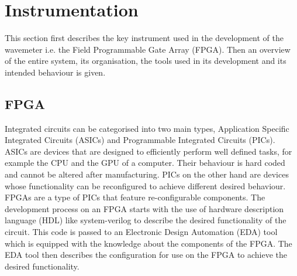 \documentclass[12pt, twoside]{report}
\begin{document}
\chapter{Instrumentation}
This section first describes the key instrument used in the development of the wavemeter i.e. the Field Programmable Gate Array (FPGA). Then an overview of the entire system, its organisation, the tools used in its development and its intended behaviour is given. 

\section{FPGA}
Integrated circuits can be categorised into two main types, Application Specific Integrated Circuits (ASICs) and Programmable Integrated Circuits (PICs). ASICs are devices that are designed to efficiently perform well defined tasks, for example the CPU and the GPU of a computer. Their behaviour is hard coded and cannot be altered after manufacturing. PICs on the other hand are devices whose functionality can be reconfigured to achieve different desired behaviour. FPGAs are a type of PICs that feature re-configurable components. The development process on an FPGA starts with the use of hardware description language (HDL) like system-verilog to describe the desired functionality of the circuit. This code is passed to an Electronic Design Automation (EDA) tool which is equipped with the knowledge about the components of the FPGA. The EDA tool then describes the configuration for use on the FPGA to achieve the desired functionality. 
\end{document}
